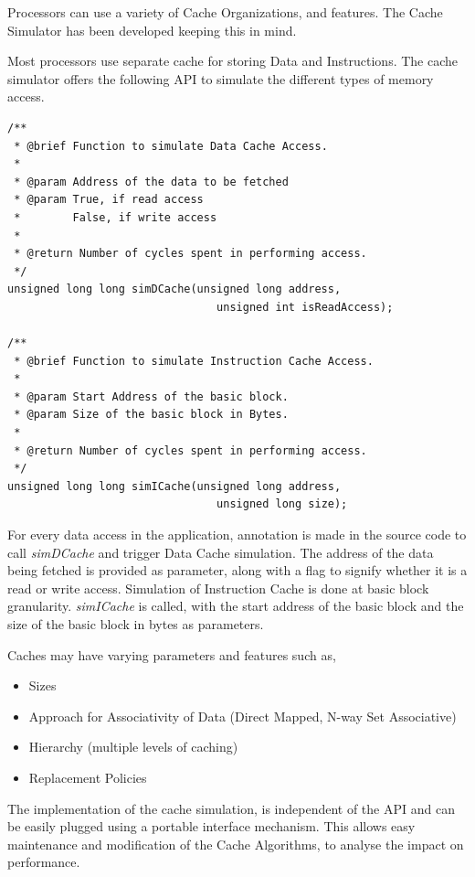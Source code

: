 Processors can use a variety of Cache Organizations, and features. The Cache Simulator has been developed keeping this in mind. 

Most processors use separate cache for storing Data and Instructions. The cache simulator offers the following API to simulate the different types of memory access.

\begin{lstlisting}[numbers=none, frame=none]
/**
 * @brief Function to simulate Data Cache Access.
 *
 * @param Address of the data to be fetched
 * @param True, if read access
 *        False, if write access
 *
 * @return Number of cycles spent in performing access.
 */
unsigned long long simDCache(unsigned long address,
                                unsigned int isReadAccess);
                                
/**
 * @brief Function to simulate Instruction Cache Access.
 *
 * @param Start Address of the basic block.
 * @param Size of the basic block in Bytes.
 *
 * @return Number of cycles spent in performing access.
 */
unsigned long long simICache(unsigned long address,
                                unsigned long size);
\end{lstlisting}

For every data access in the application, annotation is made in the source code to call \emph{simDCache} and trigger Data Cache simulation. The address of the data being fetched is provided as parameter, along with a flag to signify whether it is a read or write access. Simulation of Instruction Cache is done at basic block granularity. \emph{simICache} is called, with the start address of the basic block and the size of the basic block in bytes as parameters.

Caches may have varying parameters and features such as,
\begin{itemize} \itemsep -6pt
\item Sizes
\item Approach for Associativity of Data (Direct Mapped, N-way Set Associative)
\item Hierarchy (multiple levels of caching)
\item Replacement Policies
\end{itemize}

The implementation of the cache simulation, is independent of the API and can be easily plugged using a portable interface mechanism. This allows easy maintenance and modification of the Cache Algorithms, to analyse the impact on performance.

